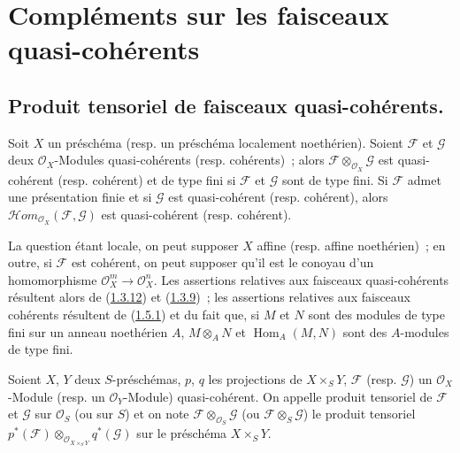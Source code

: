 \section{Compléments sur les faisceaux quasi-cohérents}
\label{section:I.9-fr}

\subsection{Produit tensoriel de faisceaux quasi-cohérents.}
\label{subsection:I.9.1-fr}

\begin{proposition}[9.1.1]
\label{I.9.1.1-fr}
Soit $X$ un préschéma \textup{(resp.} un préschéma localement noethérien). Soient
$\mathscr{F}$ et $\mathscr{G}$ deux $\mathscr{O}_X$-Modules quasi-cohérents
\textup{(resp.} cohérents)~; alors
$\mathscr{F}\otimes_{\mathscr{O}_X}\mathscr{G}$ est quasi-cohérent \textup{(resp.}
cohérent) et de type fini si $\mathscr{F}$ et $\mathscr{G}$ sont de type
fini. Si $\mathscr{F}$ admet une présentation finie et si $\mathscr{G}$ est
quasi-cohérent \textup{(resp.} cohérent), alors
$\mathscr{H}\!om_{\mathscr{O}_X}(\mathscr{F},\mathscr{G})$ est quasi-cohérent
\textup{(resp.} cohérent).
\end{proposition}

La question étant locale, on peut supposer $X$ affine (resp. affine
noethérien)~; en outre, si $\mathscr{F}$ est cohérent, on peut supposer qu'il
est le conoyau d'un homomorphisme
$\mathscr{O}_X^m\to\mathscr{O}_X^n$. Les assertions relatives aux faisceaux
quasi-cohérents résultent alors de
(\hyperref[I.1.3.12-fr]{1.3.12}) et
(\hyperref[I.1.3.9-fr]{1.3.9})~; les assertions relatives aux faisceaux
cohérents résultent de (\hyperref[I.1.5.1-fr]{1.5.1}) et du fait que, si $M$
et $N$ sont des modules de type fini sur un anneau noethérien $A$,
$M\otimes_A N$ et $\operatorname{Hom}_A(M,N)$ sont des $A$-modules de type
fini.

\begin{definition}[9.1.2]
\label{I.9.1.2-fr}
Soient $X$, $Y$ deux $S$-préschémas, $p$, $q$ les projections de
$X\times_S Y$, $\mathscr{F}$ \textup{(resp. $\mathscr{G}$)} un
$\mathscr{O}_X$-Module \textup{(resp.} un $\mathscr{O}_Y$-Module) quasi-cohérent. On
appelle produit tensoriel de $\mathscr{F}$ et $\mathscr{G}$ sur
$\mathscr{O}_S$ \textup{(ou} sur $S$) et on note
$\mathscr{F}\otimes_{\mathscr{O}_S}\mathscr{G}$ \textup{(ou}
$\mathscr{F}\otimes_S\mathscr{G}$) le produit tensoriel
$p^*(\mathscr{F})\otimes_{\mathscr{O}_{X\times_S Y}}q^*(\mathscr{G})$ sur le
préschéma $X\times_S Y$.
\end{definition}

